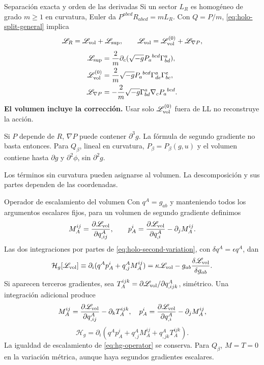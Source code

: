 \begin{frame}[label=holo-gen-02]{Separación exacta y orden de las derivadas}
\footnotesize
Si un sector $L_R$ es homogéneo de grado $m\ge1$ en curvatura, Euler da
$P^{abcd}R_{abcd}=mL_R$. Con $Q=P/m$, \eqref{eq:holo-split-general} implica
\begin{equation}
\mathscr L_R=\mathscr L_{\rm vol}+\mathscr L_{\rm sup},\qquad
\mathscr L_{\rm vol}=\mathscr L_{\rm vol}^{(0)}+\mathscr L_{\nabla P},
\label{eq:hg-split}
\end{equation}
\[
\begin{aligned}
\mathscr L_{\rm sup}&=\frac2m\partial_c(\sqrt{-g}P_a{}^{bcd}\Gamma^a_{bd}),\\
\mathscr L_{\rm vol}^{(0)}&=\frac2m\sqrt{-g}P_a{}^{bcd}\Gamma^a_{de}\Gamma^e_{bc},\\
\mathscr L_{\nabla P}&=-\frac2m\sqrt{-g}\Gamma^a_{bd}\nabla_cP_a{}^{bcd}.
\end{aligned}
\]
\textbf{El volumen incluye la corrección.} Usar solo $\mathscr L_{\rm vol}^{(0)}$ fuera de LL no reconstruye la acción.
\medskip

Si $P$ depende de $R$, $\nabla P$ puede contener $\partial^3g$.
La fórmula de segundo gradiente no basta entonces.
Para $Q_\beta$, lineal en curvatura, $P_\beta=P_\beta(g,u)$ y el volumen contiene hasta $\partial g$ y $\partial^2\phi$, sin $\partial^2g$.

Los términos sin curvatura pueden asignarse al volumen. La descomposición y sus partes dependen de las coordenadas.
\end{frame}
\begin{frame}[label=holo-gen-03]{Operador de escalamiento del volumen}
\footnotesize
Con $q^A=g_{ab}$ y manteniendo todos los argumentos escalares fijos, para un volumen de segundo gradiente definimos
\[
M_A^{ij}=\frac{\partial\mathscr L_{\rm vol}}{\partial q^A_{,ij}},\qquad
p_A^i=\frac{\partial\mathscr L_{\rm vol}}{\partial q^A_{,i}}-\partial_jM_A^{ij}.
\]
Las dos integraciones por partes de \eqref{eq:holo-second-variation}, con $\delta q^A=\epsilon q^A$, dan
\begin{equation}
\mathcal H_g[\mathscr L_{\rm vol}]
\equiv\partial_i(q^Ap_A^i+q^A_{,j}M_A^{ij})
=\kappa\mathscr L_{\rm vol}-g_{ab}\frac{\delta\mathscr L_{\rm vol}}{\delta g_{ab}}.
\label{eq:hg-operator}
\end{equation}
Si aparecen terceros gradientes, sea $T_A^{ijk}=\partial\mathscr L_{\rm vol}/\partial q^A_{,ijk}$, simétrico. Una integración adicional produce
\[
M_A^{ij}=\frac{\partial\mathscr L_{\rm vol}}{\partial q^A_{,ij}}-\partial_kT_A^{ijk},\quad
p_A^i=\frac{\partial\mathscr L_{\rm vol}}{\partial q^A_{,i}}-\partial_jM_A^{ij},
\]
\[
\mathcal H_g=\partial_i(q^Ap_A^i+q^A_{,j}M_A^{ij}+q^A_{,jk}T_A^{ijk}).
\]
La igualdad de escalamiento de \eqref{eq:hg-operator} se conserva. Para $Q_\beta$, $M=T=0$ en la variación métrica, aunque haya segundos gradientes escalares.
\end{frame}

